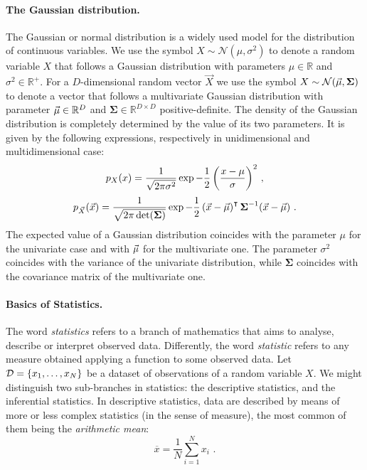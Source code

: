 \paragraph*{The Gaussian distribution.}
The Gaussian or normal distribution is a widely used model for the distribution of continuous variables. We use the symbol $X\sim\mathcal{N}(\mu,\sigma^2)$ to denote a random variable $X$ that follows a Gaussian distribution with parameters $\mu\in\mathbb{R}$ and $\sigma^2\in\mathbb{R}^{+}$. For a $D$-dimensional random vector $\vec{X}$ we use the symbol $X\sim\mathcal{N}(\vec{\mu},\boldsymbol{\Sigma})$ to denote a vector that follows a multivariate Gaussian distribution with parameter $\vec{\mu}\in\mathbb{R}^D$ and $\boldsymbol{\Sigma}\in\mathbb{R}^{D\times D}$ positive-definite. The density of the Gaussian distribution is completely determined by the value of its two parameters. It is given by the following expressions, respectively in unidimensional and multidimensional case: 
\begin{equation}
p_X(x) = \frac{1}{\sqrt{2\pi\sigma^2}}\exp{-\frac{1}{2}\left(\frac{x-\mu}{\sigma}\right)^2}\mbox{ ,}
\end{equation}
\begin{equation}
p_{\vec{X}}(\vec{x}) = \frac{1}{\sqrt{2\pi\det(\boldsymbol{\Sigma})}}\exp{-\frac{1}{2}\left(\vec{x}-\vec{\mu}\right)^\intercal \boldsymbol{\Sigma}^ {-1}(\vec{x}-\vec{\mu})} \mbox{ .}
\end{equation}
The expected value of a Gaussian distribution coincides with the parameter $\mu$ for the univariate case and with $\vec{\mu}$ for the multivariate one. The parameter $\sigma^2$ coincides with the variance of the univariate distribution, while $\boldsymbol{\Sigma}$ coincides with the covariance matrix of the multivariate one.

\paragraph*{Basics of Statistics.}
The word \emph{statistics}  refers to a branch of mathematics that aims to analyse, describe or interpret observed data. Differently, the word \emph{statistic} refers to any measure obtained applying a function to some observed data. Let $\mathcal{D} = \{x_1,\dots,x_N\}$ be a dataset of observations of a random variable $X$. We might distinguish two sub-branches in statistics: the descriptive statistics, and the inferential statistics. In descriptive statistics, data are described by means of more or less complex statistics (in the sense of measure), the most common of them being the \emph{arithmetic mean}: 
\begin{equation}
\overline{x} = \frac{1}{N}\sum_{i=1}^N x_i \mbox{ .}
\end{equation}

